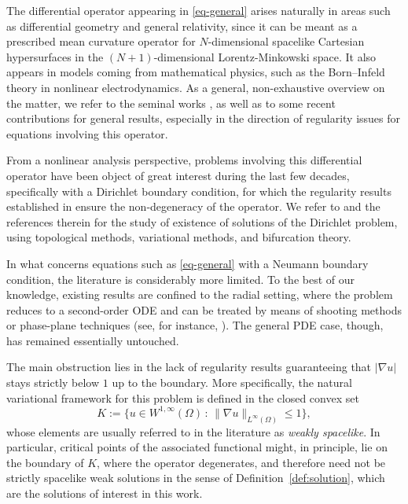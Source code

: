 \documentclass[11pt,reqno]{amsart}
\theoremstyle{plain}
\theoremstyle{definition}
\numberwithin{equation}{section}
\begin{document}
The differential operator appearing in \eqref{eq-general} arises naturally in areas such as differential geometry and general relativity, since it can be meant as a prescribed mean curvature operator for $N$-dimensional spacelike Cartesian hypersurfaces in the $(N+1)$-dimensional Lorentz-Minkowski space. It also appears in models coming from mathematical physics, such as the Born--Infeld theory in nonlinear electrodynamics. As a general, non-exhaustive overview on the matter, we refer to the seminal works \cite{BaSi82,ChYa76,Ge83}, as well as to some recent contributions \cite{BoCoFo19,BoIa19,ByIkMaMa24,MaMa25,Ma26} for general results, especially in the direction of regularity issues for equations involving this operator.

From a nonlinear analysis perspective, problems involving this differential operator have been object of great interest during the last few decades, specifically with a Dirichlet boundary condition, for which the regularity results established in \cite{BaSi82} ensure the non-degeneracy of the operator. We refer to \cite{Az14,Az16,BeJeMa14,BeJeTo13,CoObOmRi13,CoObOmRi13b,Da16,Da17,DaWa17} and the references therein for the study of existence of solutions of the Dirichlet problem, using topological methods, variational methods, and bifurcation theory.

In what concerns equations such as \eqref{eq-general} with a Neumann boundary condition, the literature is considerably more limited. To the best of our knowledge, existing results are confined to the radial setting, where the problem reduces to a second-order ODE and can be treated by means of shooting methods or phase-plane techniques (see, for instance, \cite{BoFe20,BoFe202,BoCoNo20,BoFeZa16,BoFeZa23}). The general PDE case, though, has remained essentially untouched.

The main obstruction lies in the lack of regularity results guaranteeing that $|\nabla u|$ stays strictly below $1$ up to the boundary. More specifically, the natural variational framework for this problem is defined in the closed convex set
$$K:= \{ u \in W^{1,\infty}(\Omega) \, : \, \| \nabla u \|_{L^{\infty}(\Omega)} \leq 1 \},$$
whose elements are usually referred to in the literature as
\emph{weakly spacelike}. In particular, critical points of the associated
functional might, in principle, lie on the boundary of $K$, where the
operator degenerates, and therefore need not be strictly spacelike weak
solutions in the sense of Definition~\ref{def:solution}, which are the
solutions of interest in this work.
\end{document}
